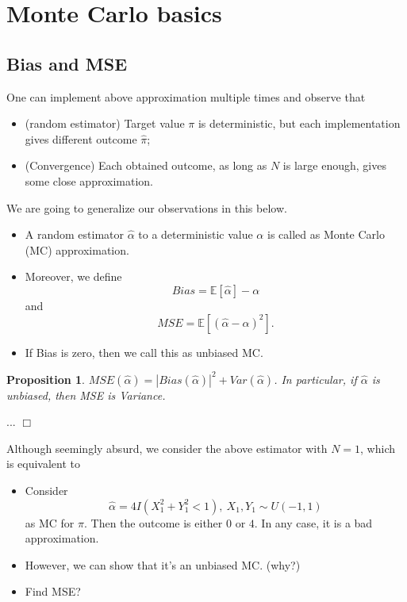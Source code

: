 \documentclass{article}
\newtheorem{proposition}[theorem]{Proposition}
\newenvironment{proof}{\noindent {\sc Proof:}}{$\Box$} %
\begin{document}
\section{Monte Carlo basics}

\subsection{Bias and MSE}
One can implement above approximation multiple times and observe that
\begin{itemize}
\item (random estimator) Target value $\pi$ is deterministic, but each implementation gives different outcome $\hat \pi$;
\item (Convergence) Each obtained outcome, as long as $N$ is large enough, gives some close approximation.
\end{itemize}

We are going to generalize our observations in this below. 
\begin{itemize}
\item
A random estimator $\hat \alpha$ to a deterministic value $\alpha$ is called as Monte Carlo (MC) approximation. 
\item Moreover, we define
$$Bias = \mathbb E [\hat \alpha] - \alpha$$
and 
$$MSE = \mathbb E [(\hat \alpha - \alpha)^2].$$
\item If Bias is zero, then we call this as unbiased MC.
\end{itemize}

\begin{proposition}
 $MSE (\hat \alpha) = |Bias(\hat \alpha)|^2 + Var(\hat \alpha)$.
 In particular, if $\hat \alpha$ is unbiased, then MSE is Variance.
\end{proposition}
\begin{proof}
  ...
\end{proof}


Although seemingly absurd, we consider the above estimator with $N = 1$, which is equivalent to 
\begin{itemize}
 \item Consider 
 $$\hat \alpha = 4 I(X_1^2 + Y_1^2 <1), \ X_1, Y_1 \sim U(-1, 1)$$ 
 as MC for $\pi$. Then the outcome is either $0$ or $4$. In any case, it is a bad approximation. 
 \item However, we can show that it's an unbiased MC. (why?)
 \item Find MSE?
\end{itemize}
\end{document}
